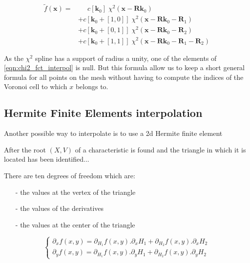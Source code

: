 \documentclass[proc]{edpsmath}
\begin{document}
\begin{align}
\label{eqn:chi2_fct_interpol}
\tilde{f}(\mathbf{x}) =& \;\;\;\;\; c[\mathbf{k}_0] \; \chi^2(\mathbf{x} - \mathbf{R}\mathbf{k}_0) \nonumber\\
	&+ c[\mathbf{k}_0 +[1,0]]\; \chi^2(\mathbf{x} - \mathbf{R}\mathbf{k}_0 - \mathbf{R}_1) \nonumber\\
	&+ c[\mathbf{k}_0 +[0,1]]\; \chi^2(\mathbf{x} - \mathbf{R}\mathbf{k}_0 - \mathbf{R}_2) \nonumber\\
	&+ c[\mathbf{k}_0 +[1,1]]\; \chi^2(\mathbf{x} - \mathbf{R}\mathbf{k}_0 - \mathbf{R}_1 - \mathbf{R}_2)
\end{align}

\rmrk  As the $\chi^2$ spline has a support of radius a unity, one of the elements of \eqref{eqn:chi2_fct_interpol} is null. But this formula allow us to keep a short general formula for all points on the mesh without having to compute the indices of the Voronoi cell to which $x$ belongs to.

\subsection{Hermite Finite Elements interpolation}
Another possible way to interpolate is to use a 2d Hermite finite element \cite{zie}   

After the root $(X,V)$ of a characteristic is found and  the triangle in which it is located has been identified... 

There are ten degrees of freedom which are:
\begin{itemize}
\item[-] the values at the vertex of the triangle 
\item[-] the values of the derivatives 
\item[-] the values at the center of the triangle 
\end{itemize}



\begin{equation}
\begin{cases}  

\partial _x f(x,y) = \partial _{H_1} f(x,y).   \partial _x H_1 +   \partial _{H_2} f(x,y).   \partial _x H_2  \\
\partial _y f(x,y) = \partial _{H_1} f(x,y).   \partial _y H_1 +   \partial _{H_2} f(x,y).   \partial _y H_2             

\end{cases}
\end{equation}
\end{document}
